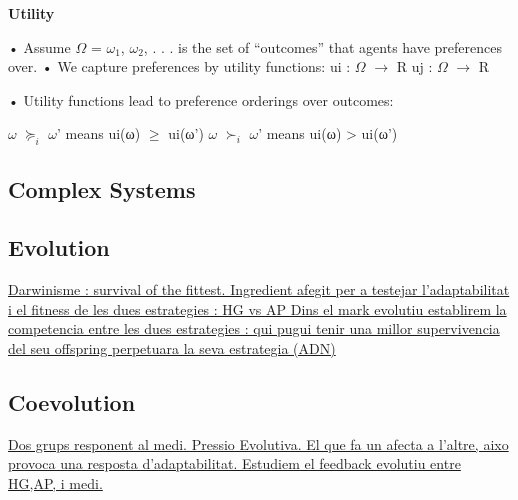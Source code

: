 \documentclass{report}
\begin{document}
\textbf{Utility}

• Assume $\Omega$ = {$\omega_1$, $\omega_2$, . . .} is the set of “outcomes” that
agents have preferences over.
• We capture preferences by utility functions:
ui : $\Omega$ $\rightarrow$ R
uj : $\Omega$ $\rightarrow$  R

• Utility functions lead to preference orderings over
outcomes:

$\omega$ $\succeq_i$ $\omega$' means ui(ω) $\geq$ ui(ω')
$\omega$ $\succ_i$ $\omega$' means ui(ω) > ui(ω')



\subsection{Complex Systems}

\subsection{Evolution}
\underline{	Darwinisme : survival of the fittest.
		Ingredient afegit per a testejar l'adaptabilitat i el fitness de les dues estrategies : HG vs AP
		Dins el mark evolutiu establirem la competencia entre les dues estrategies : qui pugui tenir una
		millor supervivencia del seu offspring perpetuara  la seva estrategia (ADN)
		}
\subsection{Coevolution}
\underline{	Dos grups responent al medi. Pressio Evolutiva. El que fa un afecta a l'altre, aixo provoca una
		resposta d'adaptabilitat. Estudiem el feedback evolutiu entre HG,AP, i medi.
		}
\end{document}
